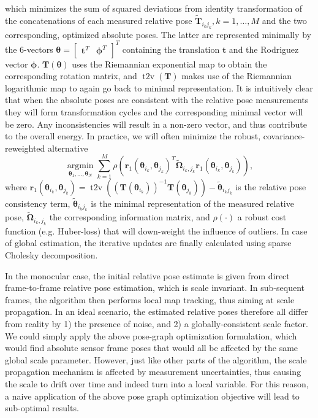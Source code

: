 \documentclass[letterpaper, 10 pt, conference]{ieeeconf}  %
\begin{document}
%
which minimizes the sum of squared deviations from identity transformation of the concatenations of each measured relative pose $\tilde{\mathbf{T}}_{i_kj_k}, k=1,\ldots,M$ and the two corresponding, optimized absolute poses. The latter are represented minimally by the 6-vectors $\boldsymbol{\theta}=\left[\begin{matrix}\mathbf{t}^T & \boldsymbol{\phi}^T\end{matrix}\right]^T$ containing the translation $\mathbf{t}$ and the Rodriguez vector $\boldsymbol{\phi}$. $\mathbf{T(\boldsymbol{\theta})}$ uses the Riemannian exponential map to obtain the corresponding rotation matrix, and $\operatorname{t2v}(\mathbf{T})$ makes use of the Riemannian logarithmic map to again go back to minimal representation. It is intuitively clear that when the absolute poses are consistent with the relative pose measurements they will form transformation cycles and the corresponding minimal vector will be zero. Any inconsistencies will result in a non-zero vector, and thus contribute to the overall energy. In practice, we will often minimize the robust, covariance-reweighted alternative
%
\begin{equation}
  \underset{\boldsymbol{\theta}_1, \ldots, \boldsymbol{\theta}_N}{\operatorname{argmin}} \sum_{k=1}^{M} \rho\left( \mathbf{r}_1(\boldsymbol{\theta}_{i_k},\boldsymbol{\theta}_{j_k})^T \boldsymbol{\tilde{\Omega}}_{i_k,j_k} \mathbf{r}_1(\boldsymbol{\theta}_{i_k},\boldsymbol{\theta}_{j_k}) \right),
\end{equation}
%
where $\mathbf{r}_1(\boldsymbol{\theta}_{i_k},\boldsymbol{\theta}_{j_k})=\operatorname{t2v}
  \left(\left(\mathbf{T}\left(\boldsymbol{\theta}_{i_k}\right)\right)^{-1} \mathbf{T}\left(\boldsymbol{\theta}_{j_k}\right)\right) - \tilde{\boldsymbol{\theta}}_{i_kj_k}$ is the relative pose consistency term, $\tilde{\boldsymbol{\theta}}_{i_kj_k}$ is the minimal representation of the measured relative pose, $\tilde{\boldsymbol{\Omega}}_{i_k,j_k}$ the corresponding information matrix, and $\rho(\cdot)$ a robust cost function (e.g. Huber-loss) that will down-weight the influence of outliers. In case of global estimation, the iterative updates are finally calculated using sparse Cholesky decomposition.

In the monocular case, the initial relative pose estimate is given from direct frame-to-frame relative pose estimation, which is scale invariant. In sub-sequent frames, the algorithm then performs local map tracking, thus aiming at scale propagation. In an ideal scenario, the estimated relative poses therefore all differ from reality by 1) the presence of noise, and 2) a globally-consistent scale factor. We could simply apply the above pose-graph optimization formulation, which would find absolute sensor frame poses that would all be affected by the same global scale parameter. However, just like other parts of the algorithm, the scale propagation mechanism is affected by measurement uncertainties, thus causing the scale to drift over time and indeed turn into a local variable. For this reason, a naive application of the above pose graph optimization objective will lead to sub-optimal results.
\end{document}
